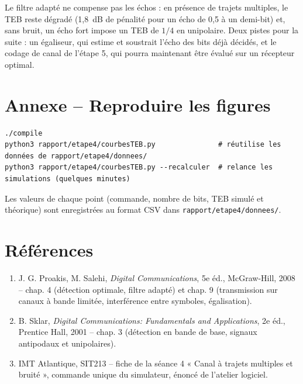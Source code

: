 \documentclass[11pt,a4paper]{article}
\begin{document}
Le filtre adapté ne compense pas les échos : en présence de trajets multiples, le TEB reste dégradé (1,8~dB de pénalité pour un écho de 0,5 à un demi-bit) et, sans bruit, un écho fort impose un TEB de $1/4$ en unipolaire. Deux pistes pour la suite : un égaliseur, qui estime et soustrait l'écho des bits déjà décidés, et le codage de canal de l'étape 5, qui pourra maintenant être évalué sur un récepteur optimal.

\section*{Annexe -- Reproduire les figures}
\begin{lstlisting}[language={}]
./compile
python3 rapport/etape4/courbesTEB.py               # réutilise les données de rapport/etape4/donnees/
python3 rapport/etape4/courbesTEB.py --recalculer  # relance les simulations (quelques minutes)
\end{lstlisting}
Les valeurs de chaque point (commande, nombre de bits, TEB simulé et théorique) sont enregistrées au format CSV dans \texttt{rapport/etape4/donnees/}.

\section*{Références}
\begin{enumerate}\small
\item[{[1]}] J. G. Proakis, M. Salehi, \emph{Digital Communications}, 5e éd., McGraw-Hill, 2008 -- chap. 4 (détection optimale, filtre adapté) et chap. 9 (transmission sur canaux à bande limitée, interférence entre symboles, égalisation).
\item[{[2]}] B. Sklar, \emph{Digital Communications: Fundamentals and Applications}, 2e éd., Prentice Hall, 2001 -- chap. 3 (détection en bande de base, signaux antipodaux et unipolaires).
\item[{[3]}] IMT Atlantique, SIT213 -- fiche de la séance 4 « Canal à trajets multiples et bruité », commande unique du simulateur, énoncé de l'atelier logiciel.
\end{enumerate}
\end{document}
